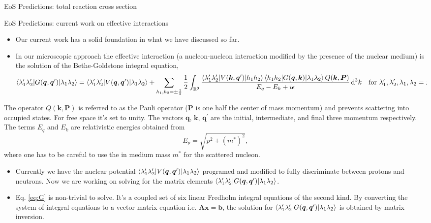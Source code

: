 \documentclass[serif]{beamer}
\newcommand{\bvec}[1]{\boldsymbol{#1}}%
\newcommand{\dd}{\,\mathrm{d}}%
\begin{document}
\begin{frame}{}
\begin{columns}[t]
\begin{column}{0.32\paperwidth}
\begin{block}{EoS Predictions: total reaction cross section}
\begin{figure}[H]
\begin{center}
\end{center}
\end{figure}
\end{block}
\begin{block}{EoS Predictions: current work on effective interactions}
\begin{itemize}
\item \alert{Our current work has a solid foundation in what we have discussed so far}.
\item In our microscopic approach the effective interaction (a nucleon-nucleon interaction modified by the presence of the nuclear medium) is the solution of the Bethe-Goldstone integral equation,
\begin{equation}
\braket{\lambda_1^\prime \lambda_2^\prime|G(\bvec{q},\bvec{q}^\prime)|\lambda_1 \lambda_2}  = \braket{\lambda_1^\prime \lambda_2^\prime|V(\bvec{q},\bvec{q}^\prime)|\lambda_1 \lambda_2} + \sum_{h_1,h_2=\pm \frac{1}{2}}\frac{1}{2}\int_{\mathbb{R}^3} \frac{\braket{\lambda_1^\prime \lambda_2^\prime|V(\bvec{k},\bvec{q}^\prime)|h_1 h_2}\braket{h_1 h_2 |G(\bvec{q},\bvec{k})|\lambda_1 \lambda_2} Q(\bvec{k},\bvec{P}) }{E_q - E_k + i \epsilon} \dd^3 k
\quad \text{for $\lambda_1^\prime,\lambda_2^\prime,\lambda_1,\lambda_2 = \pm \frac{1}{2}$}.
\label{eq:G}
\end{equation}
\end{itemize}
The operator $Q(\bvec{k},\bvec{P})$ is referred to as the Pauli operator ($\bvec{P}$ is one half the center of mass momentum) and prevents scattering into occupied states. For free space it's set to unity. The vectors $\bvec{q}$, $\bvec{k}$, $\bvec{q}^\prime$ are the initial, intermediate, and final three momentum respectively. The terms $E_q$ and $E_k$ are relativistic energies obtained from
\begin{equation}
E_p = \sqrt{p^2 + ({m^\ast})^2},
\end{equation}
where one has to be careful to use the in medium mass $m^\ast$ for the scattered nucleon.
\begin{itemize}
\item Currently we have the nuclear potential $\braket{\lambda_1^\prime \lambda_2^\prime|V(\bvec{q},\bvec{q}^\prime)|\lambda_1 \lambda_2}$ programed and modified to fully discriminate between protons and neutrons. Now we are working on solving for the matrix elements $\braket{\lambda_1^\prime \lambda_2^\prime|G(\bvec{q},\bvec{q}^\prime)|\lambda_1 \lambda_2}$.
\item Eq. \ref{eq:G} is non-trivial to solve. It's a coupled set of six linear Fredholm integral equations of the second kind. By converting the system of integral equations to a vector matrix equation i.e. $\bvec{A}\bvec{x}=\bvec{b}$, the solution for $\braket{\lambda_1^\prime \lambda_2^\prime|G(\bvec{q},\bvec{q}^\prime)|\lambda_1 \lambda_2} $ is obtained by matrix inversion.

\end{itemize}
\end{block}
\end{column}
\end{columns}
\end{frame}
\end{document}
